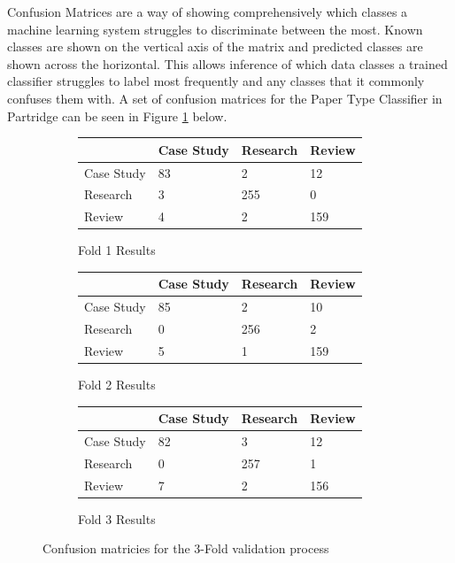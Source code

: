 Confusion Matrices are a way of showing comprehensively which classes a machine
learning system struggles to discriminate between the most. Known classes are
shown on the vertical axis of the matrix and predicted classes are shown across
the horizontal. This allows inference of which data classes a trained
classifier struggles to label most frequently and any classes that it commonly
confuses them with. A set of confusion matrices for the Paper Type Classifier
in Partridge can be seen in Figure \ref{fig:conf_matrices} below.

\begin{figure}[!h]

\centering

\begin{subfigure}[b]{\textwidth}

\caption{Fold 1 Results}
\centering
\begin{tabular}{| l || l | l | l |}
\hline
	&	Case Study&	Research&	Review\\
\hline
\hline
Case Study&	83&		2&		12\\
\hline
Research&	3&		255&		0\\
\hline
Review&		4&		2&		159\\
\hline

\end{tabular}
\end{subfigure}


\begin{subfigure}[b]{\textwidth}

\caption{Fold 2 Results}
\centering
\begin{tabular}{| l || l | l | l |}
\hline
&	        Case Study&     Research&	Review\\
\hline
\hline
Case Study&     85    &         2&		10\\
\hline
Research&	0   &		256&		2\\
\hline
Review&		5&		1&		159\\
\hline
\end{tabular}

\end{subfigure}

\begin{subfigure}[b]{\textwidth}

\caption{Fold 3 Results}
\centering
\begin{tabular}{| l || l | l | l |}
\hline
&		Case Study&	Research&	Review\\
\hline
\hline
Case Study&	82&		3	&	12 \\
Research&	0&		257	&	1\\
Review&		7&		2	&	156\\
\hline
\end{tabular}

\end{subfigure}

\caption{ Confusion matricies for the 3-Fold validation process}
\label{fig:conf_matrices}

\end{figure}

